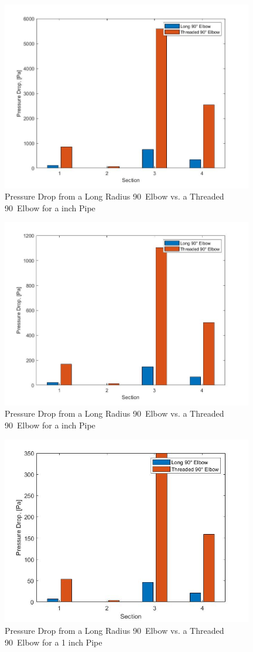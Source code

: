 \begin{figure}[H]
    \centering
    \includegraphics[width=11cm]{images/1-2in_Elbow Pressure_Drop.jpg}
    \caption{Pressure Drop from a Long Radius 90\textdegree \ Elbow vs. a Threaded 90\textdegree \ Elbow for a  inch Pipe}
\end{figure}
\begin{figure}[H]
    \centering
    \includegraphics[width=11cm]{images/3-4in_Elbow Pressure_Drop.jpg}
    \caption{Pressure Drop from a Long Radius 90\textdegree \ Elbow vs. a Threaded 90\textdegree \ Elbow for a  inch Pipe}
\end{figure}
\begin{figure}[H]
    \centering
    \includegraphics[width=11cm]{images/1in_Elbow Pressure_Drop.jpg}
    \caption{Pressure Drop from a Long Radius 90\textdegree \ Elbow vs. a Threaded 90\textdegree \ Elbow for a 1 inch Pipe}
\end{figure}

